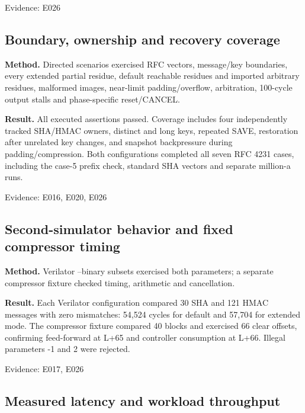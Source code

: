 \documentclass[11pt,a4paper]{article}
\begin{document}
{\small Evidence: E026}

\subsection{Boundary,\allowbreak{} ownership and recovery coverage}

\textbf{Method.} Directed scenarios exercised RFC vectors,\allowbreak{} message/\allowbreak{}key boundaries,\allowbreak{} every extended partial residue,\allowbreak{} default reachable residues and imported arbitrary residues,\allowbreak{} malformed images,\allowbreak{} near-limit padding/\allowbreak{}overflow,\allowbreak{} arbitration,\allowbreak{} 100-cycle output stalls and phase-specific reset/\allowbreak{}CANCEL.

\textbf{Result.} All executed assertions passed. Coverage includes four independently tracked SHA/\allowbreak{}HMAC owners,\allowbreak{} distinct and long keys,\allowbreak{} repeated SAVE,\allowbreak{} restoration after unrelated key changes,\allowbreak{} and snapshot backpressure during padding/\allowbreak{}compression. Both configurations completed all seven RFC 4231 cases,\allowbreak{} including the case-5 prefix check,\allowbreak{} standard SHA vectors and separate million-a runs.

{\small Evidence: E016,\allowbreak{} E020,\allowbreak{} E026}

\subsection{Second-simulator behavior and fixed compressor timing}

\textbf{Method.} Verilator --binary subsets exercised both parameters; a separate compressor fixture checked timing,\allowbreak{} arithmetic and cancellation.

\textbf{Result.} Each Verilator configuration compared 30 SHA and 121 HMAC messages with zero mismatches: 54,\allowbreak{}524 cycles for default and 57,\allowbreak{}704 for extended mode. The compressor fixture compared 40 blocks and exercised 66 clear offsets,\allowbreak{} confirming feed-forward at L+\allowbreak{}65 and controller consumption at L+\allowbreak{}66. Illegal parameters -1 and 2 were rejected.

{\small Evidence: E017,\allowbreak{} E026}

\subsection{Measured latency and workload throughput}
\end{document}
